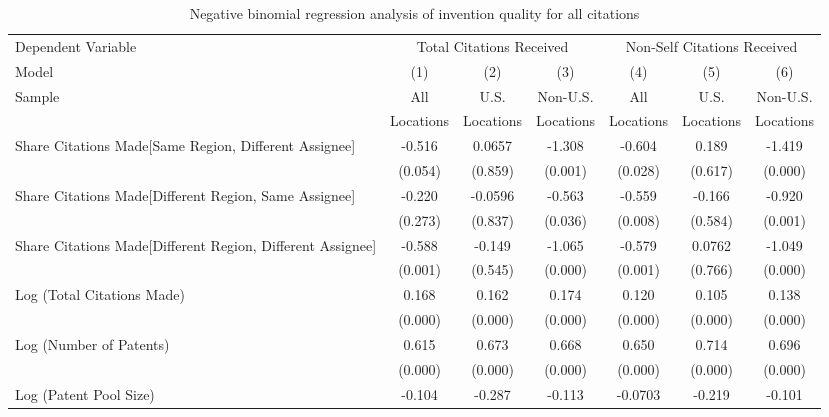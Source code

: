 \begin{sidewaystable}[htbp]\centering
\caption{Negative binomial regression analysis of invention quality for all citations \label{a.e.o.t.n.model123192021}}
\small
\onehalfspacing
\begin{tabular}{l*{6}{c}}
\hline\hline
 Dependent Variable&\multicolumn{3}{c}{Total Citations Received}&\multicolumn{3}{c}{Non-Self Citations Received}\\
                Model&\multicolumn{1}{c}{(1)}&\multicolumn{1}{c}{(2)}&\multicolumn{1}{c}{(3)}&\multicolumn{1}{c}{(4)}&\multicolumn{1}{c}{(5)}&\multicolumn{1}{c}{(6)}\\
                 \hline
 \multirow{2}{*}{Sample}&\multicolumn{1}{c}{All}&\multicolumn{1}{c}{U.S.}&\multicolumn{1}{c}{Non-U.S.}&\multicolumn{1}{c}{All}&\multicolumn{1}{c}{U.S.}&\multicolumn{1}{c}{Non-U.S.}\\       
  &\multicolumn{1}{c}{Locations}&\multicolumn{1}{c}{Locations}&\multicolumn{1}{c}{Locations}&\multicolumn{1}{c}{Locations}&\multicolumn{1}{c}{Locations}&\multicolumn{1}{c}{Locations}\\           
\hline
Share Citations Made[Same Region, Different Assignee]&   -0.516&   0.0657&   -1.308&   -0.604&    0.189&   -1.419\\
                &  (0.054)&  (0.859)&  (0.001)&  (0.028)&  (0.617)&  (0.000)\\
Share Citations Made[Different Region, Same Assignee]&   -0.220&  -0.0596&   -0.563&   -0.559&   -0.166&   -0.920\\
                &  (0.273)&  (0.837)&  (0.036)&  (0.008)&  (0.584)&  (0.001)\\
Share Citations Made[Different Region, Different Assignee]&   -0.588&   -0.149&   -1.065&   -0.579&   0.0762&   -1.049\\
                &  (0.001)&  (0.545)&  (0.000)&  (0.001)&  (0.766)&  (0.000)\\
Log (Total Citations Made)&    0.168&    0.162&    0.174&    0.120&    0.105&    0.138\\
                &  (0.000)&  (0.000)&  (0.000)&  (0.000)&  (0.000)&  (0.000)\\
Log (Number of Patents)&    0.615&    0.673&    0.668&    0.650&    0.714&    0.696\\
                &  (0.000)&  (0.000)&  (0.000)&  (0.000)&  (0.000)&  (0.000)\\
Log (Patent Pool Size)&   -0.104&   -0.287&   -0.113&  -0.0703&   -0.219&   -0.101\\

\end{tabular}
\end{sidewaystable}
